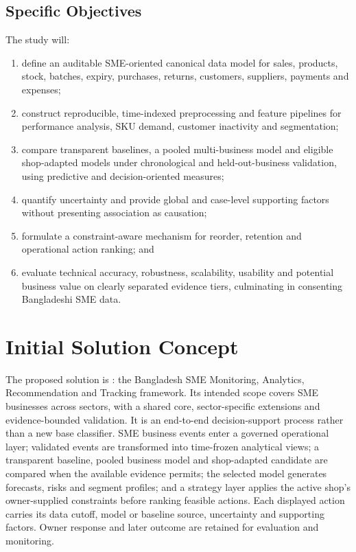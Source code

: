 \subsection{Specific Objectives}

The study will:

\begin{enumerate}[label=O\arabic*.]
  \item define an auditable SME-oriented canonical data model for sales,
  products, stock, batches, expiry, purchases, returns, customers, suppliers,
  payments and expenses;
  \item construct reproducible, time-indexed preprocessing and feature pipelines
  for performance analysis, SKU demand, customer inactivity and segmentation;
  \item compare transparent baselines, a pooled multi-business model and
  eligible shop-adapted models under chronological and held-out-business
  validation, using predictive and decision-oriented measures;
  \item quantify uncertainty and provide global and case-level supporting
  factors without presenting association as causation;
  \item formulate a constraint-aware mechanism for reorder, retention and
  operational action ranking; and
  \item evaluate technical accuracy, robustness, scalability, usability and
  potential business value on clearly separated evidence tiers, culminating in
  consenting Bangladeshi SME data.
\end{enumerate}

\section{Initial Solution Concept}

The proposed solution is \system{}: the Bangladesh SME Monitoring, Analytics,
Recommendation and Tracking framework. Its intended scope covers SME businesses across sectors, with a shared
core, sector-specific extensions and evidence-bounded validation. It is an end-to-end decision-support process rather than a new base
classifier. SME business events enter a governed
operational layer; validated events are transformed into time-frozen analytical
views; a transparent baseline, pooled business model and shop-adapted candidate
are compared when the available evidence permits; the selected model generates
forecasts, risks and segment profiles; and a strategy layer applies the active
shop's owner-supplied constraints before ranking feasible actions. Each
displayed action carries its data cutoff, model or baseline source, uncertainty
and supporting factors. Owner response and later outcome are retained for
evaluation and monitoring.

